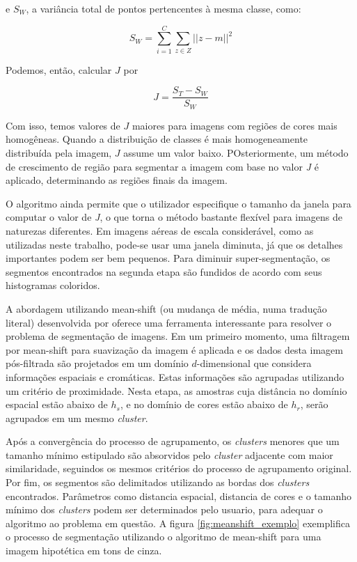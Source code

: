 e $S_W$, a variância total de pontos pertencentes à mesma classe, como:

\begin{equation}
	\displaystyle S_W = \sum_{i=1}^C \sum_{z \in Z} || z - m ||^2
\end{equation}

Podemos, então, calcular $J$ por

\begin{equation}
	\displaystyle J = \frac{S_T - S_W}{S_W}
\end{equation}

Com isso, temos valores de $J$ maiores para imagens com regiões de cores mais homogêneas. Quando a distribuição de classes é mais homogeneamente distribuída pela imagem, $J$ assume um valor baixo. POsteriormente, um método de crescimento de região para segmentar a imagem com base no valor \textit{J} é aplicado, determinando as regiões finais da imagem.

O algoritmo ainda permite que o utilizador especifique o tamanho da janela para computar o valor de \textit{J}, o que torna o método bastante flexível para imagens de naturezas diferentes. Em imagens aéreas de escala considerável, como as utilizadas neste trabalho, pode-se usar uma janela diminuta, já que os detalhes importantes podem ser bem pequenos. Para diminuir super-segmentação, os segmentos encontrados na segunda etapa são fundidos de acordo com seus histogramas coloridos.


A abordagem utilizando mean-shift (ou mudança de média, numa tradução literal) desenvolvida por  oferece uma ferramenta interessante para resolver o problema de segmentação de imagens. Em um primeiro momento, uma filtragem por mean-shift para suavização da imagem é aplicada e os dados desta imagem pós-filtrada são projetados em um domínio $d$-dimensional que considera informações espaciais e cromáticas. Estas informações são agrupadas utilizando um critério de proximidade. Nesta etapa, as amostras cuja distância no domínio espacial estão abaixo de $h_s$, e no domínio de cores estão abaixo de $h_r$, serão agrupados em um mesmo \textit{cluster}.

Após a convergência do processo de agrupamento, os \textit{clusters} menores que um tamanho mínimo estipulado são absorvidos pelo \textit{cluster} adjacente com maior similaridade, seguindos os mesmos critérios do processo de agrupamento original. Por fim, os segmentos são delimitados utilizando as bordas dos \textit{clusters} encontrados. Parâmetros como distancia espacial, distancia de cores e o tamanho mínimo dos \textit{clusters} podem ser determinados pelo usuario, para adequar o algoritmo ao problema em questão. A figura \ref{fig:meanshift_exemplo} exemplifica o processo de segmentação utilizando o algoritmo de mean-shift para uma imagem hipotética em tons de cinza.

